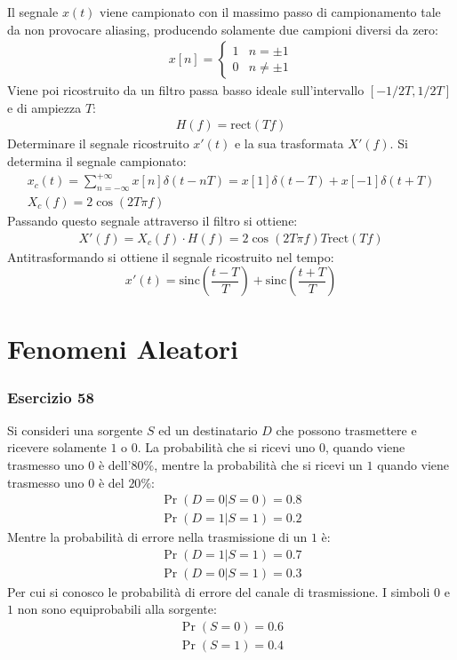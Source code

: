 \documentclass{article}
\newcommand{\rect}{\mathrm{rect}}
\newcommand{\sinc}{\mathrm{sinc}}
\begin{document}
Il segnale $x(t)$ viene campionato con il massimo passo di campionamento tale da non provocare aliasing, producendo solamente due campioni diversi da zero:
\begin{gather*}
    x[n]=
    \begin{cases}
        1 &n=\pm1\\
        0 &n\neq\pm1
    \end{cases}
\end{gather*}
Viene poi ricostruito da un filtro passa basso ideale sull'intervallo $[-1/2T,1/2T]$ e di ampiezza $T$:
\begin{gather*}
    H(f)=\rect\displaystyle\left(Tf\right)
\end{gather*} 
Determinare il segnale ricostruito $x'(t)$ e la sua trasformata $X'(f)$. 
Si determina il segnale campionato:
\begin{gather*}
    x_c(t)=\displaystyle\sum_{n=-\infty}^{+\infty}x[n]\delta(t-nT)=x[1]\delta(t-T)+x[-1]\delta(t+T)\\
    X_c(f)=2\cos(2T\pi f)
\end{gather*}
Passando questo segnale attraverso il filtro si ottiene:
\begin{gather}
    X'(f)=X_c(f)\cdot H(f)=2\cos(2T\pi f)T\rect(Tf)
\end{gather}
Antitrasformando si ottiene il segnale ricostruito nel tempo:
\begin{equation}
    x'(t)=\displaystyle\sinc\left(\frac{t-T}{T}\right)+\sinc\left(\frac{t+T}{T}\right)
\end{equation}

\clearpage

\section{Fenomeni Aleatori}

\subsubsection*{Esercizio 58}

Si consideri una sorgente $S$ ed un destinatario $D$ che possono trasmettere e ricevere solamente $1$ o $0$. La probabilità che si ricevi uno $0$, 
quando viene trasmesso uno $0$ è dell'$80\%$, mentre la probabilità che si ricevi un $1$ quando viene trasmesso uno $0$ è del $20\%$:
\begin{gather*}
    \Pr(D=0|S=0)=0.8\\
    \Pr(D=1|S=1)=0.2
\end{gather*}
Mentre la probabilità di errore nella trasmissione di un $1$ è:
\begin{gather*}
    \Pr(D=1|S=1)=0.7\\
    \Pr(D=0|S=1)=0.3
\end{gather*}
Per cui si conosco le probabilità di errore del canale di trasmissione.
I simboli $0$ e $1$ non sono equiprobabili alla sorgente:
\begin{gather*}
    \Pr(S=0)=0.6\\
    \Pr(S=1)=0.4
\end{gather*}
\end{document}
